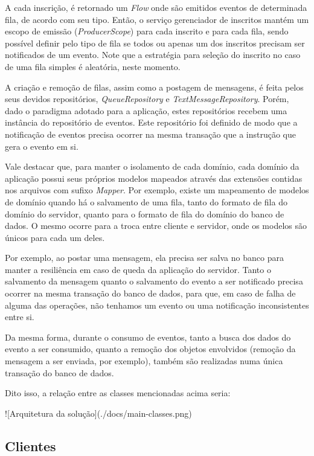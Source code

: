 \documentclass{article}
\begin{document}
A cada inscrição, é retornado um \textit{Flow} onde são emitidos eventos de determinada fila, de acordo com seu tipo.
Então, o serviço gerenciador de inscritos mantém um escopo de emissão (\textit{ProducerScope}) para cada inscrito e para cada fila,
sendo possível definir pelo tipo de fila se todos ou apenas um dos inscritos precisam ser notificados de um evento.
Note que a estratégia para seleção do inscrito no caso de uma fila simples é aleatória, neste momento.

A criação e remoção de filas, assim como a postagem de mensagens, é feita pelos seus devidos repositórios, 
\textit{QueueRepository} e \textit{TextMessageRepository}. Porém, dado o paradigma adotado para a aplicação,
estes repositórios recebem uma instância do repositório de eventos. Este repositório foi definido de
modo que a notificação de eventos precisa ocorrer na mesma transação que a instrução que gera o evento em si.

Vale destacar que, para manter o isolamento de cada domínio, cada domínio da aplicação possui seus próprios modelos
mapeados através das extensões contidas nos arquivos com sufixo \textit{Mapper}. Por exemplo, existe um mapeamento de
modelos de domínio quando há o salvamento de uma fila, tanto do formato de fila do domínio do servidor, quanto para
o formato de fila do domínio do banco de dados. O mesmo ocorre para a troca entre cliente e servidor, onde os modelos
são únicos para cada um deles.

Por exemplo, ao postar uma mensagem, ela precisa ser salva no banco para manter a resiliência em caso
de queda da aplicação do servidor. Tanto o salvamento da mensagem quanto o salvamento do evento a ser notificado
precisa ocorrer na mesma transação do banco de dados, para que, em caso de falha de alguma das operações, não
tenhamos um evento ou uma notificação inconsistentes entre si.

Da mesma forma, durante o consumo de eventos, tanto a busca dos dados do evento a ser consumido, quanto a remoção dos
objetos envolvidos (remoção da mensagem a ser enviada, por exemplo), também são realizadas numa única transação do 
banco de dados.

Dito isso, a relação entre as classes mencionadas acima seria:

![Arquitetura da solução](./docs/main-classes.png)

\subsection{Clientes}
\end{document}
